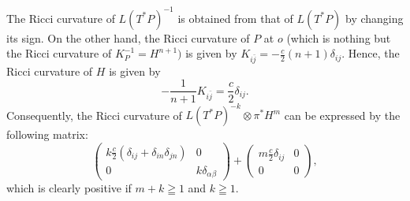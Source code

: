 \documentclass[lang=en,12pt]{beautybook}
\begin{document}
The Ricci curvature of $L (T^{\ast} P)^{- 1}$ is obtained from that of $L
(T^{\ast} P)$ by changing its sign. On the other hand, the Ricci curvature of
$P$ at $o$ (which is nothing but the Ricci curvature of $K_P^{- 1}
= H^{n + 1})$ is given by $K_{i \bar{j}} = - \frac{c}{2}  (n + 1)
\delta_{ij}$. Hence, the Ricci curvature of $H$ is given by
\[ - \frac{1}{n + 1} K_{i \bar{j}} = \frac{c}{2} \delta_{ij} . \]
Consequently, the Ricci curvature of $L (T^{\ast} P)^{- k} \otimes \pi^{\ast}
H^m$ can be expressed by the following matrix:
\[ \left( \begin{array}{cc}
     k \frac{c}{2}  (\delta_{ij} + \delta_{in} \delta_{jn}) & 0\\
     0 & k \delta_{\alpha \beta}
   \end{array} \right) + \left( \begin{array}{cc}
     m \frac{c}{2} \delta_{ij} & 0\\
     0 & 0
   \end{array} \right), \]
which is clearly positive if $m + k \geqq 1$ and $k \geqq 1$.
\end{document}
